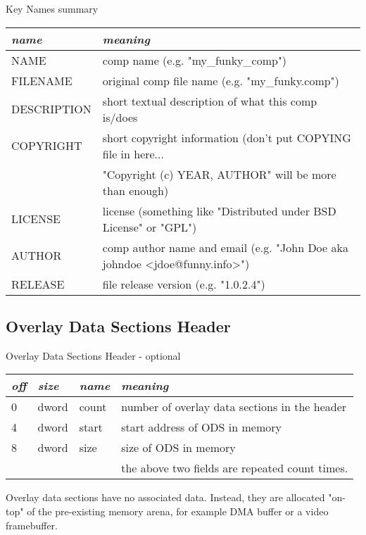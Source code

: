 \documentclass[onecolumn]{article}
\begin{document}
\begin{center}
\par Key Names summary
\begin{tabular}{|l|l|}\hline
\emph{name} & \emph{meaning} \\
\hline\hline
NAME           & comp name (e.g. "my\_funky\_comp") \\
FILENAME       & original comp file name (e.g. "my\_funky.comp") \\
DESCRIPTION    & short textual description of what this comp is/does \\
COPYRIGHT      & short copyright information (don't put COPYING file in here... \\
               & "Copyright (c) YEAR, AUTHOR" will be more than enough) \\
LICENSE        & license (something like "Distributed under BSD License" or "GPL") \\
AUTHOR         & comp author name and email (e.g. "John Doe aka johndoe <jdoe@funny.info>") \\
RELEASE        & file release version (e.g. "1.0.2.4") \\
\hline
\end{tabular}
\end{center}


\subsection{Overlay Data Sections Header}
\label{sec:odshdr}

\begin{center}
\par Overlay Data Sections Header - optional
\begin{tabular}{|l|l|l|l|}\hline
\emph{off} & \emph{size} & \emph{name} & \emph{meaning} \\
\hline\hline
0      & dword    & count      & number of overlay data sections in the header \\
4      & dword    & start      & start address of ODS in memory \\
8      & dword    & size       & size of ODS in memory \\
       &          &            & the above two fields are repeated count times. \\
\hline
\end{tabular}
\end{center}

\par Overlay data sections have no associated data. Instead, they are allocated "on-top" of the
pre-existing memory arena, for example DMA buffer or a video framebuffer.


\small

%
%
\end{document}
